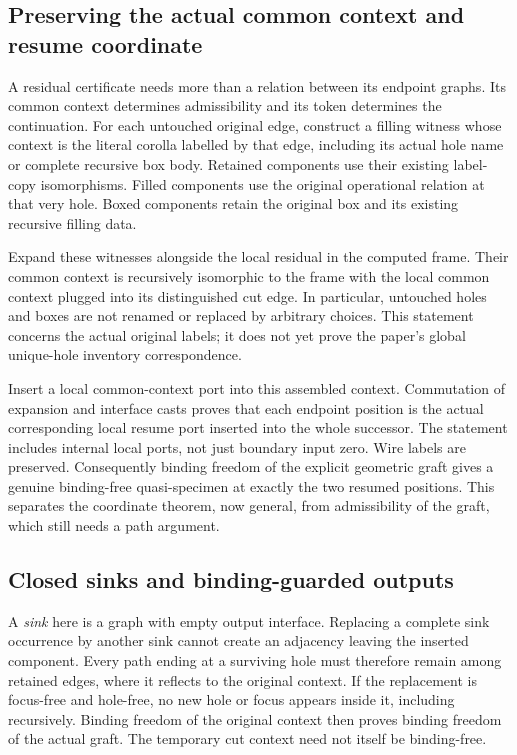 \subsection{Preserving the actual common context and resume coordinate}
A residual certificate needs more than a relation between its endpoint
graphs. Its common context determines admissibility and its token determines
the continuation. For each untouched original edge, construct a filling
witness whose context is the literal corolla labelled by that edge, including
its actual hole name or complete recursive box body. Retained components
use their existing label-copy isomorphisms. Filled components use the
original operational relation at that very hole. Boxed components retain
the original box and its existing recursive filling data.

Expand these witnesses alongside the local residual in the computed frame.
Their common context is recursively isomorphic to the frame with the local
common context plugged into its distinguished cut edge. In particular,
untouched holes and boxes are not renamed or replaced by arbitrary choices.
This statement concerns the actual original labels; it does not yet prove
the paper's global unique-hole inventory correspondence.

Insert a local common-context port into this assembled context. Commutation
of expansion and interface casts proves that each endpoint position is the
actual corresponding local resume port inserted into the whole successor.
The statement includes internal local ports, not just boundary input zero.
Wire labels are preserved. Consequently binding freedom of the explicit
geometric graft gives a genuine binding-free quasi-specimen at exactly the
two resumed positions. This separates the coordinate theorem, now general,
from admissibility of the graft, which still needs a path argument.

\subsection{Closed sinks and binding-guarded outputs}
A \emph{sink} here is a graph with empty output interface. Replacing a complete
sink occurrence by another sink cannot create an adjacency leaving the
inserted component. Every path ending at a surviving hole must therefore
remain among retained edges, where it reflects to the original context.
If the replacement is focus-free and hole-free, no new hole or focus appears
inside it, including recursively. Binding freedom of the original context
then proves binding freedom of the actual graft. The temporary cut context
need not itself be binding-free.

